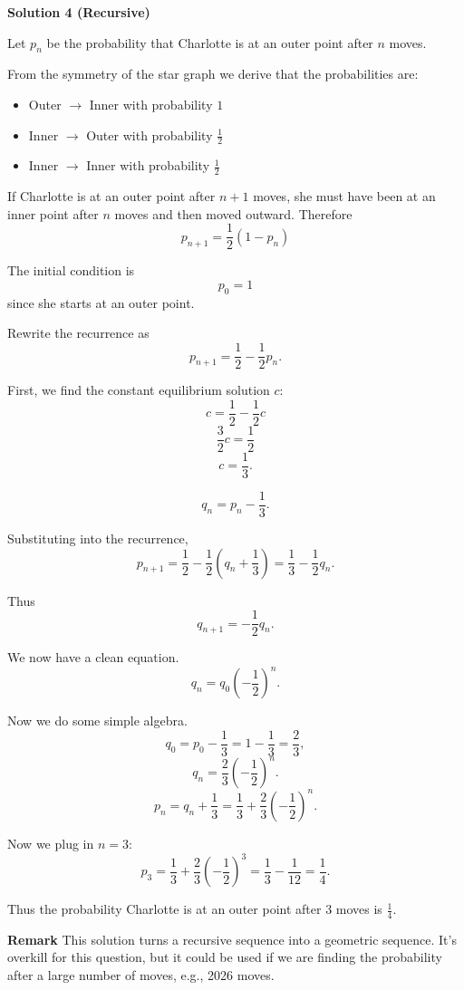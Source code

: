 \begin{enumerate}
 



\textbf{Solution 4 (Recursive)}

Let $p_n$ be the probability that Charlotte is at an outer point after $n$ moves.

 From the symmetry of the star graph we derive that the probabilities are:

 
            \begin{itemize}
        \item Outer $\to$ Inner with probability $1$
        \item Inner $\to$ Outer with probability $\frac12$
        \item Inner $\to$ Inner with probability $\frac12$
            \end{itemize}
            If Charlotte is at an outer point after $n+1$ moves, she must have been at an inner point after $n$ moves and then moved outward. Therefore
 \[p_{n+1}=\frac12(1-p_n)\]

 The initial condition is
 \[p_0=1\]since she starts at an outer point.

 Rewrite the recurrence as
 \[p_{n+1}=\frac12-\frac12 p_n.\]

 


 First, we find the constant equilibrium solution $c$:
 \[c=\frac12-\frac12 c\]
 \[\frac32 c=\frac12\]
 \[c=\frac13.\]

 \[q_n=p_n-\frac13.\]

 Substituting into the recurrence,
 \[p_{n+1}=\frac12-\frac12\left(q_n+\frac13\right) =\frac13-\frac12 q_n.\]

 Thus
 \[q_{n+1}=-\frac12 q_n.\]

 We now have a clean equation.
 \[q_n=q_0\left(-\frac12\right)^n.\]

 Now we do some simple algebra.
 \[q_0=p_0-\frac13=1-\frac13=\frac23,\]
 \[q_n=\frac23\left(-\frac12\right)^n.\]
 \[p_n=q_n+\frac13=\frac13+\frac23\left(-\frac12\right)^n.\]

 Now we plug in $n=3$:
 \[p_3=\frac13+\frac23\left(-\frac12\right)^3 =\frac13-\frac1{12} =\frac14.\]

 Thus the probability Charlotte is at an outer point after $3$ moves is $\boxed{\frac14}$.

 \textbf{Remark} This solution turns a recursive sequence into a geometric sequence. It's overkill for this question, but it could be used if we are finding the probability after a large number of moves, e.g., 2026 moves.


\end{enumerate}
